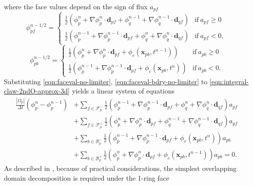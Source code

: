 \documentclass[../thesis.tex]{subfiles}
\begin{document}
where the face values depend on the sign of flux \(a_{pf}\)
\begin{equation}\label{eqn:faceval-no-limiter}
	\phi_{pf}^{n-1/2} =
	\begin{cases}
		\frac{1}{2}(\phi_p^n + \nabla\phi_p^n\cdot\mathbf{d}_{pf} +
		\phi_q^{n-1} + \nabla\phi_q^{n-1}\cdot\mathbf{d}_{qf})
		& \text{if}\ a_{pf} \geq 0 \\
		\frac{1}{2}(\phi_p^{n-1} + \nabla\phi_p^{n-1}\cdot\mathbf{d}_{pf} +
		\phi_q^{n} + \nabla\phi_q^{n}\cdot\mathbf{d}_{qf})
		& \text{if}\ a_{pf} < 0,
	\end{cases}
\end{equation}
\begin{equation}\label{eqn:faceval-bdry-no-limiter}
	\phi_{pb}^{n-1/2} =
	\begin{cases}
		\frac{1}{2}\left(\phi_p^n + \nabla\phi_p^n\cdot\mathbf{d}_{pf} +
		\phi_e(\mathbf{x}_{pb}, t^{n-1})\right)
		& \text{if}\ a_{pb} \geq 0 \\
		\frac{1}{2}
		\left(
			\phi_p^{n-1} + \nabla\phi_p^{n-1}\cdot\mathbf{d}_{pf}
			+ \phi_e(\mathbf{x}_{pb}, t^{n})
		\right)
		& \text{if}\ a_{pb} < 0.
	\end{cases}
\end{equation}
Substituting \eqref{eqn:faceval-no-limiter}, \eqref{eqn:faceval-bdry-no-limiter}
to \eqref{eqn:integral-claw-2ndO-approx-3d} yields a linear system of equations
\begin{equation}
	\begin{split}
		\frac{|\Omega_p|}{\Delta t}(\phi_p^{n} - \phi_p^{n-1})
	&+ \sum_{f \in \mathcal{F}_p^-}
	\frac{1}{2}\left(
			\phi_p^{n-1} + \nabla\phi_p^{n-1}\cdot\mathbf{d}_{pf} +
			\phi_q^{n} + \nabla\phi_q^{n}\cdot\mathbf{d}_{qf}
		\right) a_{pf}\\
	&+ \sum_{f \in \mathcal{F}_p^+}
	\frac{1}{2}\left(
			\phi_p^n + \nabla\phi_p^n\cdot\mathbf{d}_{pf} +
			\phi_q^{n-1} + \nabla\phi_q^{n-1}\cdot\mathbf{d}_{qf}
		\right) a_{pf}\\
	&+ \sum_{b \in \mathcal{B}_p^-}
	\frac{1}{2}\left(
			\phi_p^{n-1} + \nabla\phi_p^{n-1}\cdot\mathbf{d}_{pf}
			+ \phi_e(\mathbf{x}_{pb}, t^{n})
		\right) a_{pb}\\
	&+ \sum_{b \in \mathcal{B}_p^+}
	\frac{1}{2}\left(
		\phi_p^n + \nabla\phi_p^n\cdot\mathbf{d}_{pf} +
		\phi_e(\mathbf{x}_{pb}, t^{n-1})
		\right) a_{pb} = 0.
	\end{split}
\end{equation}
As described in \cite{2019_Hahn}, because of practical considerations,
the simplest overlapping domain decomposition is required under the 1-ring face
\end{document}
